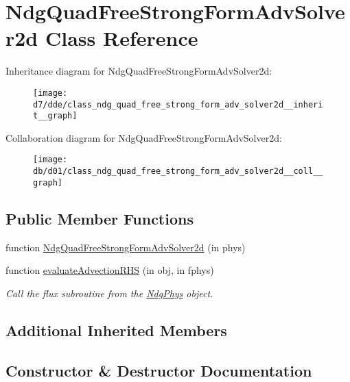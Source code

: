 \hypertarget{class_ndg_quad_free_strong_form_adv_solver2d}{}\section{Ndg\+Quad\+Free\+Strong\+Form\+Adv\+Solver2d Class Reference}
\label{class_ndg_quad_free_strong_form_adv_solver2d}


Inheritance diagram for Ndg\+Quad\+Free\+Strong\+Form\+Adv\+Solver2d\+:
\nopagebreak
\begin{figure}[H]
\begin{center}
\leavevmode
\texttt{[image: d7/dde/class\_ndg\_quad\_free\_strong\_form\_adv\_solver2d\_\_inherit\_\_graph]}
\end{center}
\end{figure}


Collaboration diagram for Ndg\+Quad\+Free\+Strong\+Form\+Adv\+Solver2d\+:
\nopagebreak
\begin{figure}[H]
\begin{center}
\leavevmode
\texttt{[image: db/d01/class\_ndg\_quad\_free\_strong\_form\_adv\_solver2d\_\_coll\_\_graph]}
\end{center}
\end{figure}
\subsection*{Public Member Functions}
\begin{DoxyCompactItemize}
\item 
function \hyperlink{class_ndg_quad_free_strong_form_adv_solver2d_a3a544488a5cac7ddd1eb28afe1e2f9b4}{Ndg\+Quad\+Free\+Strong\+Form\+Adv\+Solver2d} (in phys)
\item 
function \hyperlink{class_ndg_quad_free_strong_form_adv_solver2d_a34b6d69bedc4278e8a940448b4fae55b}{evaluate\+Advection\+R\+HS} (in obj, in fphys)
\begin{DoxyCompactList}\small\item\em Call the flux subroutine from the \hyperlink{class_ndg_phys}{Ndg\+Phys} object. \end{DoxyCompactList}\end{DoxyCompactItemize}
\subsection*{Additional Inherited Members}


\subsection{Constructor \& Destructor Documentation}
\mbox{\label{class_ndg_quad_free_strong_form_adv_solver2d_a3a544488a5cac7ddd1eb28afe1e2f9b4}} 

